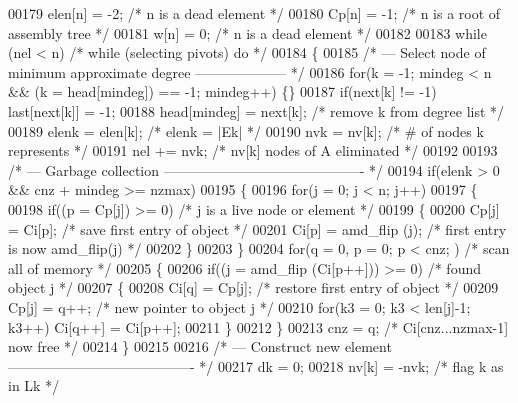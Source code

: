 \begin{DoxyCode}
00179   elen[n] = -2;                         \textcolor{comment}{/* n is a dead element */}
00180   Cp[n] = -1;                           \textcolor{comment}{/* n is a root of assembly tree */}
00181   w[n] = 0;                             \textcolor{comment}{/* n is a dead element */}
00182   
00183   \textcolor{keywordflow}{while} (nel < n)                         \textcolor{comment}{/* while (selecting pivots) do */}
00184   \{
00185     \textcolor{comment}{/* --- Select node of minimum approximate degree -------------------- */}
00186     \textcolor{keywordflow}{for}(k = -1; mindeg < n && (k = head[mindeg]) == -1; mindeg++) \{\}
00187     \textcolor{keywordflow}{if}(next[k] != -1) last[next[k]] = -1;
00188     head[mindeg] = next[k];          \textcolor{comment}{/* remove k from degree list */}
00189     elenk = elen[k];                  \textcolor{comment}{/* elenk = |Ek| */}
00190     nvk = nv[k];                      \textcolor{comment}{/* # of nodes k represents */}
00191     nel += nvk;                        \textcolor{comment}{/* nv[k] nodes of A eliminated */}
00192     
00193     \textcolor{comment}{/* --- Garbage collection ------------------------------------------- */}
00194     \textcolor{keywordflow}{if}(elenk > 0 && cnz + mindeg >= nzmax)
00195     \{
00196       \textcolor{keywordflow}{for}(j = 0; j < n; j++)
00197       \{
00198         \textcolor{keywordflow}{if}((p = Cp[j]) >= 0)      \textcolor{comment}{/* j is a live node or element */}
00199         \{
00200           Cp[j] = Ci[p];          \textcolor{comment}{/* save first entry of object */}
00201           Ci[p] = amd\_flip (j);    \textcolor{comment}{/* first entry is now amd\_flip(j) */}
00202         \}
00203       \}
00204       \textcolor{keywordflow}{for}(q = 0, p = 0; p < cnz; ) \textcolor{comment}{/* scan all of memory */}
00205       \{
00206         \textcolor{keywordflow}{if}((j = amd\_flip (Ci[p++])) >= 0)  \textcolor{comment}{/* found object j */}
00207         \{
00208           Ci[q] = Cp[j];       \textcolor{comment}{/* restore first entry of object */}
00209           Cp[j] = q++;          \textcolor{comment}{/* new pointer to object j */}
00210           \textcolor{keywordflow}{for}(k3 = 0; k3 < len[j]-1; k3++) Ci[q++] = Ci[p++];
00211         \}
00212       \}
00213       cnz = q;                       \textcolor{comment}{/* Ci[cnz...nzmax-1] now free */}
00214     \}
00215     
00216     \textcolor{comment}{/* --- Construct new element ---------------------------------------- */}
00217     dk = 0;
00218     nv[k] = -nvk;                     \textcolor{comment}{/* flag k as in Lk */}

\end{DoxyCode}
